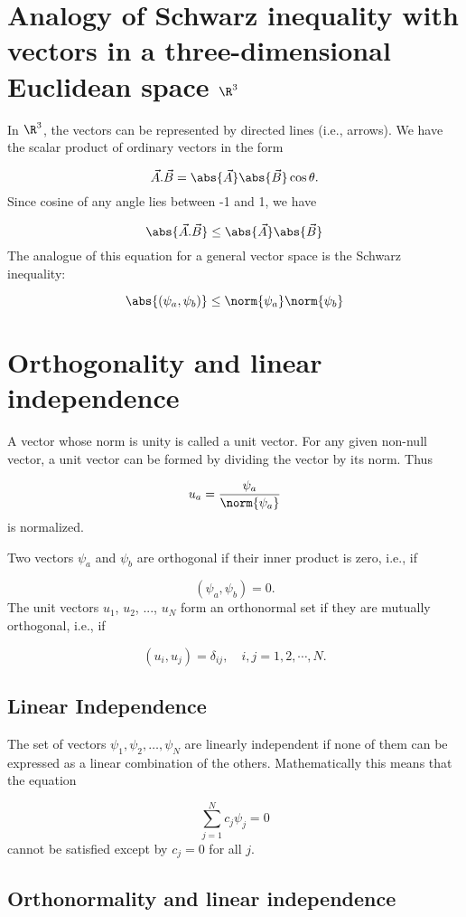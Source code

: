\section{Analogy of Schwarz inequality with vectors in a three-dimensional Euclidean space $\R^3$}

In $\R^3$, the vectors can be represented by directed lines (i.e., arrows). We have the scalar product of ordinary vectors in the form

$$\vec{A}.\vec{B} = \abs{\vec{A}}\abs{\vec{B}} \cos \theta.$$
Since cosine of any angle lies between -1 and 1, we have

$$\abs{\vec{A}.\vec{B}} \leq \abs{\vec{A}}\abs{\vec{B}}$$
The analogue of this equation for a general vector space is the Schwarz inequality:

$$\abs{(\psi_a, \psi_b)} \leq \norm{\psi_a} \norm{\psi_b}$$




\section{Orthogonality and linear independence}

A vector whose norm is unity is called a unit vector. For any given non-null vector, a unit vector can be formed by dividing the vector by its norm. Thus

$$u_a = \frac{\psi_a}{\norm{\psi_a}}$$
is normalized.

Two vectors $\psi_a$ and $\psi_b$ are orthogonal if their inner product is zero, i.e., if

$$(\psi_a,\psi_b) = 0.$$
The unit vectors $u_1$, $u_2$, ..., $u_N$ form an orthonormal set if they are mutually orthogonal, i.e., if

$$(u_i,u_j) = \delta_{ij}, \quad i,j = 1,2, \cdots , N.$$

\subsection{Linear Independence}

The set of vectors $\psi_1, \psi_2, \ldots , \psi_N$ are linearly independent if none of them can be expressed as a linear combination of the others. Mathematically this means that the equation

$$\sum_{j=1}^{N} c_j \psi_j = 0$$
cannot be satisfied except by $c_j = 0$ for all $j$.

\subsection{Orthonormality and linear independence}

